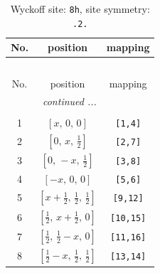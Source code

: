 \documentclass[fleqn,8pt]{jsarticle}
\begin{document}
\begin{longtable}{ccc}
\caption{Wyckoff site: {\tt 8h}, site symmetry: {\tt .2.}}
 \\
 \hline \hline
No. & position & mapping \\ \hline \endfirsthead

\multicolumn{2}{l}{\tablename\ \thetable{}} \\
 \hline \hline
No. & position & mapping \\ \hline \endhead

 \hline \hline
\multicolumn{2}{r}{\footnotesize\it continued ...} \\ \endfoot

 \hline \hline
\multicolumn{2}{r}{} \\ \endlastfoot

1 & $\left[ x,\, 0,\, 0 \right]$ & {\tt [1,4]} \\ \hline
2 & $\left[ 0,\, x,\, \frac{1}{2} \right]$ & {\tt [2,7]} \\ \hline
3 & $\left[ 0,\, - x,\, \frac{1}{2} \right]$ & {\tt [3,8]} \\ \hline
4 & $\left[ - x,\, 0,\, 0 \right]$ & {\tt [5,6]} \\ \hline
5 & $\left[ x + \frac{1}{2},\, \frac{1}{2},\, \frac{1}{2} \right]$ & {\tt [9,12]} \\ \hline
6 & $\left[ \frac{1}{2},\, x + \frac{1}{2},\, 0 \right]$ & {\tt [10,15]} \\ \hline
7 & $\left[ \frac{1}{2},\, \frac{1}{2} - x,\, 0 \right]$ & {\tt [11,16]} \\ \hline
8 & $\left[ \frac{1}{2} - x,\, \frac{1}{2},\, \frac{1}{2} \right]$ & {\tt [13,14]} \\
\end{longtable}
\renewcommand{\arraystretch}{1.2}
\end{document}
